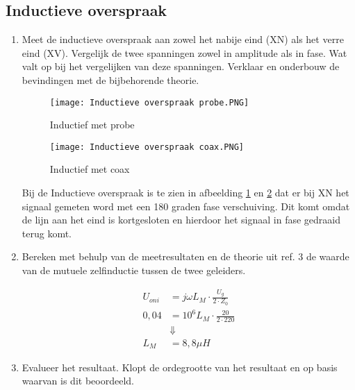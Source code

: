 \newpage

\subsection{Inductieve overspraak}
\begin{enumerate}
    \item Meet de inductieve overspraak aan zowel het nabije eind (XN) als het verre eind (XV). Vergelijk de twee spanningen zowel in amplitude als in fase. Wat valt op bij het vergelijken
    van deze spanningen. Verklaar en onderbouw de bevindingen met de bijbehorende theorie.

    \begin{figure}[H]
        \centering
        \texttt{[image: Inductieve overspraak probe.PNG]}
        \caption{Inductief met probe}
        \label{fig:Inductief met probe}
    \end{figure}

    \begin{figure}[H]
        \centering
        \texttt{[image: Inductieve overspraak coax.PNG]}
        \caption{Inductief met coax}
        \label{fig:Inductief met coax}
    \end{figure}

    Bij de Inductieve overspraak is te zien in afbeelding \ref{fig:Inductief met probe} en \ref{fig:Inductief met coax} dat er bij XN het signaal gemeten word met een 180 graden fase verschuiving. Dit komt omdat de lijn aan het eind is kortgesloten en hierdoor het signaal in fase gedraaid terug komt.
    
    \item Bereken met behulp van de meetresultaten en de theorie uit ref. 3 de waarde van de
    mutuele zelfinductie tussen de twee geleiders.

    \begin{equation}
        \begin{split}
            U_{oni} &= j \omega L_{M} \cdot \frac{U_{g}}{2 \cdot Z_{0}}\\
            0,04 &= 10^6 L_{M} \cdot \frac{20}{2 \cdot 220}\\
            &\Downarrow \\
            L_{M} &= 8,8 \mu H
        \end{split}
    \end{equation}

    \item Evalueer het resultaat. Klopt de ordegrootte van het resultaat en op basis waarvan is dit
    beoordeeld.

\end{enumerate}

